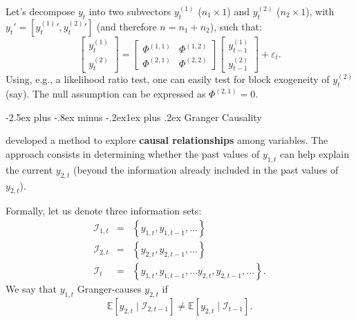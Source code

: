 \documentclass[
  11pt,
]{book}
\makeatletter
\renewcommand\subsection{\@startsection{subsection}{2}{\z@}
  {-2.5ex plus -.8ex minus -.2ex}{1ex plus .2ex}
  {\normalfont\large\bfseries\color{TextbookInk}}}
\theoremstyle{definition}
\theoremstyle{definition}
\theoremstyle{definition}
\theoremstyle{definition}
\theoremstyle{remark}
\makeatother
\begin{document}
Let's decompose \(y_t\) into two subvectors \(y^{(1)}_{t}\) (\(n_1 \times 1\)) and \(y^{(2)}_{t}\) (\(n_2 \times 1\)), with \(y_t' = [{y^{(1)}_{t}}',{y^{(2)}_{t}}']\) (and therefore \(n=n_1 +n_2\)), such that:
\[
\left[
\begin{array}{c}
y^{(1)}_{t}\\
y^{(2)}_{t}
\end{array}
\right] = \left[
\begin{array}{cc}
\Phi^{(1,1)} & \Phi^{(1,2)}\\
\Phi^{(2,1)} & \Phi^{(2,2)}
\end{array}
\right]
\left[
\begin{array}{c}
y^{(1)}_{t-1}\\
y^{(2)}_{t-1}
\end{array}
\right] + \varepsilon_t.
\]
Using, e.g., a likelihood ratio test, one can easily test for block exogeneity of \(y_t^{(2)}\) (say). The null assumption can be expressed as \(\Phi^{(2,1)}=0\).

\subsection{Granger Causality}\label{granger-causality}

\citet{Granger_1969} developed a method to explore \textbf{causal relationships} among variables. The approach consists in determining whether the past values of \(y_{1,t}\) can help explain the current \(y_{2,t}\) (beyond the information already included in the past values of \(y_{2,t}\)).

Formally, let us denote three information sets:
\begin{eqnarray*}
\mathcal{I}_{1,t} & = & \left\{ y_{1,t},y_{1,t-1},\ldots\right\} \\
\mathcal{I}_{2,t} & = & \left\{ y_{2,t},y_{2,t-1},\ldots\right\} \\
\mathcal{I}_{t} & = & \left\{ y_{1,t},y_{1,t-1},\ldots y_{2,t},y_{2,t-1},\ldots\right\}.
\end{eqnarray*}
We say that \(y_{1,t}\) Granger-causes \(y_{2,t}\) if
\[
\mathbb{E}\left[y_{2,t}\mid \mathcal{I}_{2,t-1}\right]\neq \mathbb{E}\left[y_{2,t}\mid \mathcal{I}_{t-1}\right].
\]
\end{document}
